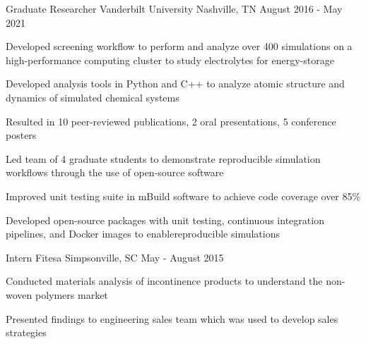 
\begin{cventries}
  \cventry
    {Graduate Researcher} %
    {Vanderbilt University} %
    {Nashville, TN} %
    {August 2016 - May 2021} %
    {
        \begin{cvfirstitemstitle}
        \end{cvfirstitemstitle}
      \begin{cvsubitems} %
        \item{Developed screening workflow to perform and analyze over 400
            simulations on a high-performance \newline computing cluster to study
              electrolytes for energy-storage}
        \item{Developed analysis tools in Python and C++ to analyze atomic structure
            and dynamics of simulated chemical systems}
        \item{Resulted in 10 peer-reviewed publications, 2 oral presentations, 5
            conference posters}
      \end{cvsubitems}
      \begin{cvitemstitle}
      \end{cvitemstitle}
      \begin{cvsubitems}
        \item{Led team of 4 graduate students to demonstrate reproducible
            simulation workflows through the use of open-source software}
        \item{Improved unit testing suite in mBuild software to achieve code coverage over
            85\%}
        \item{Developed open-source packages with unit testing, continuous
            integration pipelines, and Docker images to enable\newline reproducible
            simulations}
      \end{cvsubitems}
    }


  \cventry
    {Intern} %
    {Fitesa} %
    {Simpsonville, SC} %
    {May - August 2015} %
    {
      \begin{cvitems} %
        \item{Conducted materials analysis of incontinence products to
            understand the non-woven polymers market}
        \item{Presented findings to engineering sales team which was used to
            develop sales strategies}
      \end{cvitems}
    }
\end{cventries}
